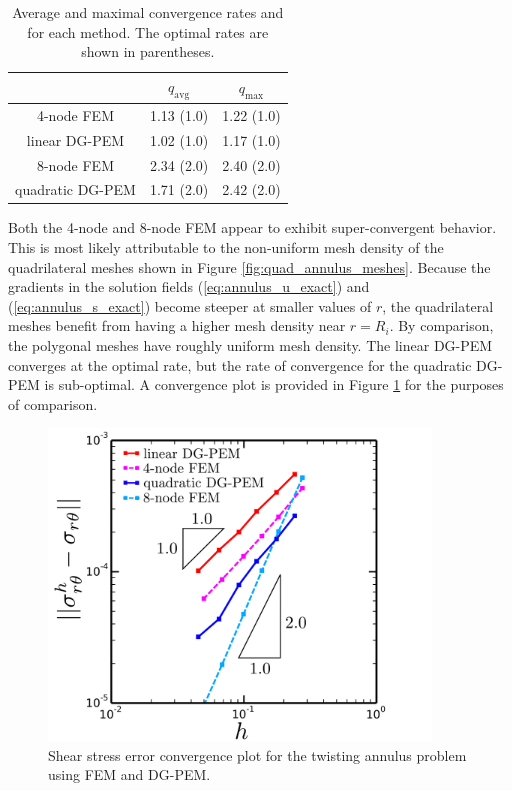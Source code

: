 \begin{table}[!ht]
  \begin{center}
    \begin{tabular}{| c || c | c |}
    \hline
           & $q_{\text{avg}}$ & $q_{\text{max}}$ \\ \hline \hline
    4-node FEM       & 1.13 (1.0) & 1.22 (1.0) \\ \hline
    linear DG-PEM    & 1.02 (1.0) & 1.17 (1.0) \\ \hline
    8-node FEM       & 2.34 (2.0) & 2.40 (2.0) \\ \hline
    quadratic DG-PEM & 1.71 (2.0) & 2.42 (2.0) \\
    \hline
    \end{tabular}
    \caption{Average and maximal convergence rates and for each method. The optimal rates are shown in parentheses.}
    \vspace{-5pt}
    \label{tab:twisting_annulus_convergence_rates}
    \vspace{-10pt}
  \end{center}
\end{table}

Both the 4-node and 8-node FEM appear to exhibit super-convergent behavior. This is most likely attributable to the non-uniform mesh density of the quadrilateral meshes shown in Figure \ref{fig:quad_annulus_meshes}. Because the gradients in the solution fields (\ref{eq:annulus_u_exact}) and (\ref{eq:annulus_s_exact}) become steeper at smaller values of $r$, the quadrilateral meshes benefit from having a higher mesh density near $r = R_i$. By comparison, the polygonal meshes have roughly uniform mesh density. The linear DG-PEM converges at the optimal rate, but the rate of convergence for the quadratic DG-PEM is sub-optimal. A convergence plot is provided in Figure \ref{fig:twisting_annulus_errors} for the purposes of comparison.

\begin{figure}[!h]
    \centering
    \includegraphics[width=4.0in]{figures/twisting_annulus_h1_errors.pdf}
    \caption{Shear stress error convergence plot for the twisting annulus problem using FEM and DG-PEM.}
  \label{fig:twisting_annulus_errors}
\end{figure}


